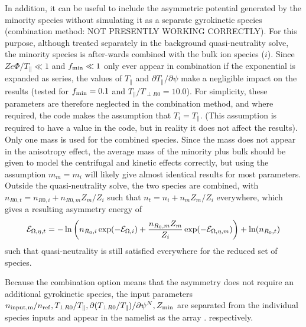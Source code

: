 In addition, it can be useful to include the asymmetric potential generated by the minority species without simulating it as a separate gyrokinetic species (combination method: NOT PRESENTLY WORKING CORRECTLY).
For this purpose, although treated separately in the background quasi-neutrality solve, the minority species is after-wards combined with the bulk ion species ($i$).  
Since $Z e \Phi / T_\parallel \ll 1$ and $f_{\rm min} \ll 1$ only ever appear in combination if the exponential is expanded as series, 
the values of $T_\parallel$ and $\partial T_\parallel / \partial \psi$ make a negligible impact on the results 
(tested for $f_{\rm min} = 0.1$ and $T_\parallel/T_{\perp R0} = 10.0 $). 
For simplicity, these parameters are therefore neglected in the combination method, and where required, the code makes the assumption that $T_i = T_\parallel$.  (This assumption is required to have a value in the code, but in reality it does not affect the results). Only one mass is used for the combined species.  Since the mass does not appear in the anisotropy effect, the average mass of the minority plus bulk should be given
to model the centrifugal and kinetic effects correctly, but using the assumption $m_m = m_i$ will likely give almost identical results 
for most parameters.  Outside the quasi-neutrality solve, the two species are combined, with $n_{R0,t} = n_{R0,i} + n_{R0,m} Z_m / Z_i$ such that $n_t = n_i + n_m Z_m / Z_i $ everywhere, which gives a resulting asymmetry energy of
\begin{equation}
   {\cal E}_{\Omega,\eta,t} =  -\ln\left(n_{R_0,i}\exp(-{\cal E}_{\Omega,i}) + \frac{n_{R_0,m} Z_m}{Z_i}\exp(-{\cal E}_{\Omega,\eta,m})\right) + \ln(n_{R_0,t})
\end{equation}
such that quasi-neutrality is still satisfied everywhere for the reduced set of species.  

Because the combination option means that the asymmetry does not require an additional gyrokinetic species, the 
input parameters $n_{\rm input,m}/n_{\rm ref}, T_{\perp R0}/T_\parallel, \partial (T_{\perp R0}/T_\parallel) / \partial \psi^N, Z_{\rm min}$ are 
separated from the individual species inputs and appear in the  namelist as the array .
respectively.  

